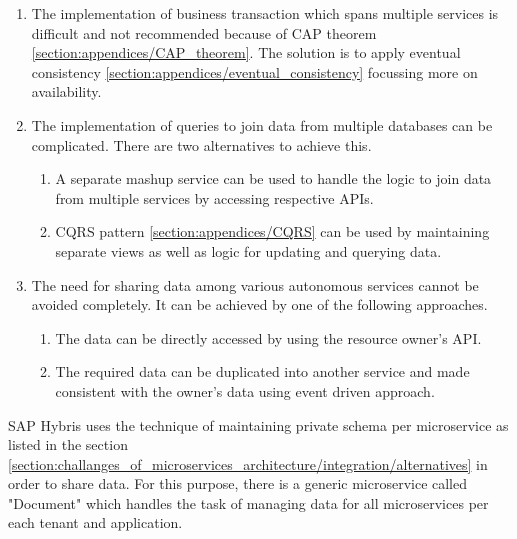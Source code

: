 \begin{enumerate}
\item The implementation of business transaction which spans multiple services is difficult and not recommended because of \acrshort{CAP} theorem \ref{section:appendices/CAP_theorem}. The solution is to apply eventual consistency \ref{section:appendices/eventual_consistency} focussing more on availability.
\item The implementation of queries to join data from multiple databases can be complicated. There are two alternatives to achieve this.
    \begin{enumerate}
        \item A separate mashup service can be used to handle the logic to join data from multiple services by accessing respective \acrshort{API}s.
        \item \acrshort{CQRS} pattern \ref{section:appendices/CQRS} can be used by maintaining separate views as well as logic for updating and querying data.
    \end{enumerate}
\item The need for sharing data among various autonomous services cannot be avoided completely. It can be achieved by one of the following approaches.
    \begin{enumerate}
        \item The data can be directly accessed by using the resource owner's \acrshort{API}.
        \item The required data can be duplicated into another service and made consistent with the owner's data using event driven approach.
    \end{enumerate}
\end{enumerate}
\begin{shaded}
SAP Hybris uses the technique of maintaining private schema per microservice as listed in the section \ref{section:challanges_of_microservices_architecture/integration/alternatives} in order to share data. For this purpose, there is a generic microservice called "Document" which handles the task of managing data for all microservices per each tenant and application.
\end{shaded}

